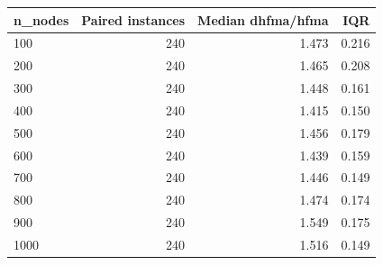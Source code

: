 \begin{tabular}{lrrr}
\toprule
n\_nodes & Paired instances & Median dhfma/hfma & IQR \\
\midrule
100 & 240 & 1.473 & 0.216 \\
200 & 240 & 1.465 & 0.208 \\
300 & 240 & 1.448 & 0.161 \\
400 & 240 & 1.415 & 0.150 \\
500 & 240 & 1.456 & 0.179 \\
600 & 240 & 1.439 & 0.159 \\
700 & 240 & 1.446 & 0.149 \\
800 & 240 & 1.474 & 0.174 \\
900 & 240 & 1.549 & 0.175 \\
1000 & 240 & 1.516 & 0.149 \\
\bottomrule
\end{tabular}
